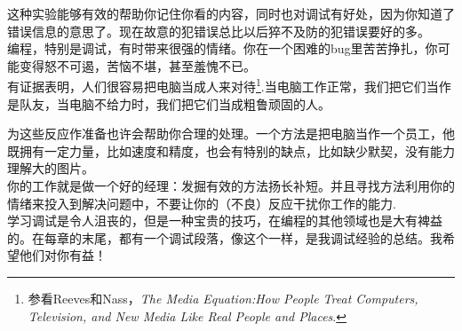 
这种实验能够有效的帮助你记住你看的内容，同时也对调试有好处，因为你知道了错误信息的意思了。现在故意的犯错误总比以后猝不及防的犯错误要好的多。\\

编程，特别是调试，有时带来很强的情绪。你在一个困难的bug里苦苦挣扎，你可能变得怒不可遏，苦恼不堪，甚至羞愧不已。\\

有证据表明，人们很容易把电脑当成人来对待\footnote{参看Reeves和Nass，{\it The Media Equation:How People Treat Computers, Television, and New Media Like Real People and Places}.}.当电脑工作正常，我们把它们当作是队友，当电脑不给力时，我们把它们当成粗鲁顽固的人。\\


为这些反应作准备也许会帮助你合理的处理。一个方法是把电脑当作一个员工，他既拥有一定力量，比如速度和精度，也会有特别的缺点，比如缺少默契，没有能力理解大的图片。\\

你的工作就是做一个好的经理：发掘有效的方法扬长补短。并且寻找方法利用你的情绪来投入到解决问题中，不要让你的（不良）反应干扰你工作的能力.\\

学习调试是令人沮丧的，但是一种宝贵的技巧，在编程的其他领域也是大有裨益的。在每章的末尾，都有一个调试段落，像这个一样，是我调试经验的总结。我希望他们对你有益！

